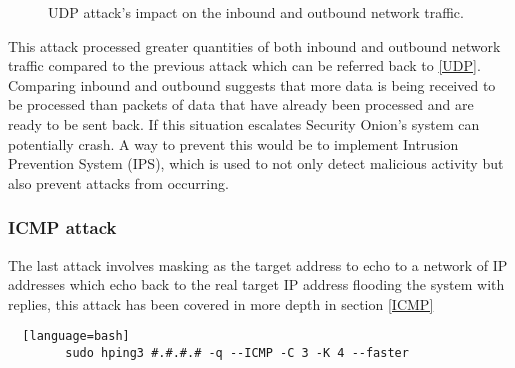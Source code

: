 \documentclass[12pt]{article}
\begin{document}
		
		\begin{center}
		\begin{figure}[H]
			\centering
			\qquad
			\caption{UDP attack's impact on the inbound and outbound network traffic.}
			\label{fig:net1}
		\end{figure}
		
		\end{center}
		
		This attack processed greater quantities of both inbound and outbound network traffic compared to the previous attack which can be referred back to \ref{UDP}. Comparing inbound and outbound suggests that more data is being received to be processed than packets of data that have already been processed and are ready to be sent back. If this situation escalates Security Onion's system can potentially crash. 
		A way to prevent this would be to implement Intrusion Prevention System (IPS), which is used to not only detect malicious activity but also prevent attacks from occurring. 
		
		
		
		\subsubsection{ICMP attack}
		The last attack involves masking as the target address to echo to a network of IP addresses which echo back to the real target IP address flooding the system with replies, this attack has been covered in more depth in section \ref{ICMP}
		\begin{lstlisting}  [language=bash]
		sudo hping3 #.#.#.# -q --ICMP -C 3 -K 4 --faster
		\end{lstlisting}
		
\end{document}
